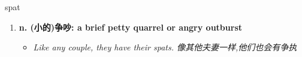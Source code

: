 
\begin{frame}
{\huge spat}
\begin{center}
\begin{enumerate}\Large
  \item \textbf{n. (小的)争吵: a brief petty quarrel or angry outburst}
  \begin{itemize}
    \item \em{\Large{Like any couple, they have their spats. 像其他夫妻一样,他们也会有争执}}
  \end{itemize}
\end{enumerate}
\end{center}
\end{frame}
